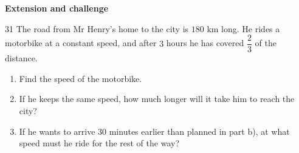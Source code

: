 \documentclass[11pt]{article}
\newenvironment{probbox}[2]{\begin{probboxT}{#1}{#2}}{\end{probboxT}}
\newcommand{\dividerbar}[1]{\par\vspace{0.6em}\noindent
  \begin{tcolorbox}[enhanced,frame hidden,interior hidden,borderline west={5pt}{0pt}{ProbBlue},
    colback=white,left=12pt,right=12pt,top=5pt,bottom=5pt,arc=4pt]
  {\large\bfseries\color{ProbBlue} #1}\end{tcolorbox}\vspace{0.4em}}
\begin{document}
\providecommand{\rvabBox}[4]{\begin{tikzpicture}[baseline=-0.7ex,font=\small]
  \path (-0.66,-0.42) rectangle (0.66,0.42);
  \draw[Navy,line width=0.8pt,fill=tmBlue!6] (-0.66,-0.32) rectangle (0.66,0.32);
  \draw[Navy,line width=0.8pt] (0,-0.32)--(0,0.32) (-0.66,0)--(0.66,0);
  \node[inner sep=0pt] at (-0.33,0.16){$#1$};\node[inner sep=0pt] at (0.33,0.16){$#2$};
  \node[inner sep=0pt] at (-0.33,-0.16){$#3$};\node[inner sep=0pt] at (0.33,-0.16){$#4$};\end{tikzpicture}}

\clearpage
\dividerbar{Extension and challenge}

\begin{probbox}{31}{\relax}
The road from Mr Henry's home to the city is $180$ km long. He rides a motorbike at a constant speed, and after $3$ hours he has covered
$\dfrac{2}{3}$ of the distance.
\begin{enumerate}[label=\alph*),leftmargin=1.6em,itemsep=1pt,topsep=2pt]
\item Find the speed of the motorbike.
\item If he keeps the same speed, how much longer will it take him to reach the city?
\item If he wants to arrive $30$ minutes earlier than planned in part b), at what speed must he ride for the rest of the way?
\end{enumerate}
\end{probbox}
\end{document}
